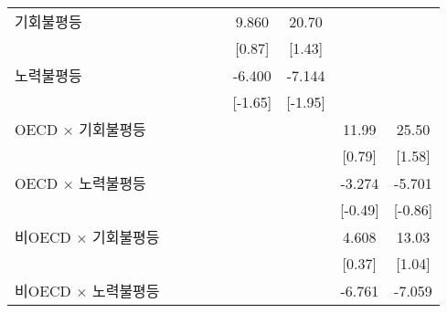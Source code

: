 \begin{tabular}{l*{8}{c}}
\addlinespace
기회불평등        &                     &                     &                     &                     &       9.860         &       20.70         &                     &                     \\
                    &                     &                     &                     &                     &      [0.87]         &      [1.43]         &                     &                     \\
\addlinespace
노력불평등        &                     &                     &                     &                     &      -6.400\sym{*}  &      -7.144\sym{*}  &                     &                     \\
                    &                     &                     &                     &                     &     [-1.65]         &     [-1.95]         &                     &                     \\
\addlinespace
OECD $\times$ 기회불평등&                     &                     &                     &                     &                     &                     &       11.99         &       25.50         \\
                    &                     &                     &                     &                     &                     &                     &      [0.79]         &      [1.58]         \\
\addlinespace
OECD $\times$ 노력불평등&                     &                     &                     &                     &                     &                     &      -3.274         &      -5.701         \\
                    &                     &                     &                     &                     &                     &                     &     [-0.49]         &     [-0.86]         \\
\addlinespace
비OECD $\times$ 기회불평등&                     &                     &                     &                     &                     &                     &       4.608         &       13.03         \\
                    &                     &                     &                     &                     &                     &                     &      [0.37]         &      [1.04]         \\
\addlinespace
비OECD $\times$ 노력불평등&                     &                     &                     &                     &                     &                     &      -6.761\sym{*}  &      -7.059\sym{*}  \\

\end{tabular}
